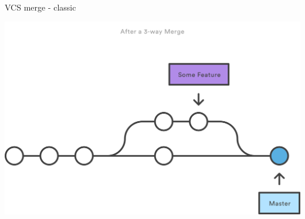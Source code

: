 \begin{frame}[fragile]{VCS merge - classic}

\begin{center}
\includegraphics[width=\textwidth]{git-merge-nff2}
\end{center}

\end{frame}
